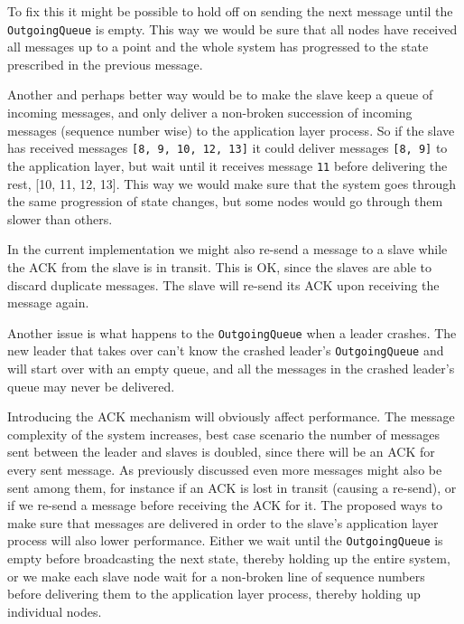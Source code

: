 \documentclass[a4paper, 11pt]{article}
\begin{document}
To fix this it might be possible to hold off on sending the next message until the \texttt{OutgoingQueue} is empty. This way we would be sure that all nodes have received all messages up to a point and the whole system has progressed to the state prescribed in the previous message.

Another and perhaps better way would be to make the slave keep a queue of incoming messages, and only deliver a non-broken succession of incoming messages (sequence number wise) to the application layer process. So if the slave has received messages \texttt{[8, 9, 10, 12, 13]} it could deliver messages \texttt{[8, 9]} to the application layer, but wait until it receives message \texttt{11} before delivering the rest, {[10, 11, 12, 13]}. This way we would make sure that the system goes through the same progression of state changes, but some nodes would go through them slower than others.

In the current implementation we might also re-send a message to a slave while the ACK from the slave is in transit. This is OK, since the slaves are able to discard duplicate messages. The slave will re-send its ACK upon receiving the message again.

Another issue is what happens to the \texttt{OutgoingQueue} when a leader crashes. The new leader that takes over can't know the crashed leader's \texttt{OutgoingQueue} and will start over with an empty queue, and all the messages in the crashed leader's queue may never be delivered.

Introducing the ACK mechanism will obviously affect performance. The message complexity of the system increases, best case scenario the number of messages sent between the leader and slaves is doubled, since there will be an ACK for every sent message. 
As previously discussed even more messages might also be sent among them, for instance if an ACK is lost in transit (causing a re-send), or if we re-send a message before receiving the ACK for it. 
The proposed ways to make sure that messages are delivered in order to the slave's application layer process will also lower performance. Either we wait until the \texttt{OutgoingQueue} is empty before broadcasting the next state, thereby holding up the entire system, or we make each slave node wait for a non-broken line of sequence numbers before delivering them to the application layer process, thereby holding up individual nodes.
\end{document}

